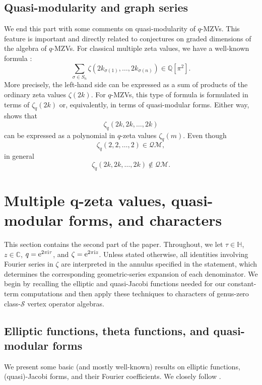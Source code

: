 \documentclass[pdftex]{sigma}
\numberwithin{equation}{section}
\theoremstyle{definition}
\begin{document}
\subsection{Quasi-modularity and graph series}\label{section2.6}
We end this part with some comments on quasi-modularity of $q$-MZVs.
This feature is important and directly related to conjectures on graded dimensions
of the algebra of $q$-MZVs. For classical multiple zeta values, we
have a well-known formula \cite{Hoffman}:
\[
\sum_{ \sigma \in S_n} \zeta(2k_{\sigma(1)},\dots,2k_{\sigma(n)}) \in \mathbb{Q}[\pi^2].
\]
More precisely, the left-hand side can be expressed as a sum of products of the ordinary zeta values $\zeta(2k)$. For $q$-MZVs, this type of formula is formulated in terms of $\zeta_q(2k)$
or, equivalently, in terms of quasi-modular forms. Either way, \cite{Bradley} shows that
\[
\mathcal{\zeta}_q(2k,2k,\dots,2k)
\]
can be expressed as a polynomial in $q$-zeta values $\zeta_q(m)$. Even though \cite{AR}
\[
\mathcal{\zeta}_q(2,2,\dots,2) \in \mathcal{QM},
\]
 in general
\[
\mathcal{\zeta}_q(2k,2k,\dots,2k) \notin \mathcal{QM}.
\]

\section[Multiple q-zeta values, quasi-modular forms, and characters]{Multiple $\boldsymbol{q}$-zeta values, quasi-modular forms, and characters}\label{section3}

This section contains the second part of the paper. Throughout, we let
$\tau\in\mathbb H$, $z\in\mathbb C$, $q={\rm e}^{2\pi {\rm i}\tau}$, and
$\zeta={\rm e}^{2\pi {\rm i} z}$.
Unless stated otherwise, all identities involving Fourier series in $\zeta$
are interpreted in the annulus specified in the statement, which determines
the corresponding geometric-series expansion of each denominator. We begin by
recalling the elliptic and quasi-Jacobi functions needed for our constant-term
computations and then apply these techniques to characters of genus-zero
class-$\mathcal{S}$ vertex operator algebras.


\subsection{Elliptic functions, theta functions, and quasi-modular forms}\label{section3.1}
We present some basic (and mostly well-known) results on elliptic functions, (quasi)-Jacobi forms, and their Fourier coefficients. We closely follow \cite{Lang}.
\end{document}
